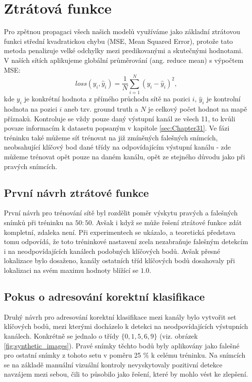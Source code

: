 \section{Ztrátová funkce}
\label{sec:Chapter47}
Pro zpětnou propagaci všech našich modelů využíváme jako základní ztrátovou funkci střední kvadratickou chybu (MSE, Mean Squared Error), protože tato metoda penalizuje velké odchylky mezi predikovanými a skutečnými hodnotami.  V naších sítích aplikujeme globální průměrování (ang. reduce mean) s výpočtem MSE:
\begin{equation}
    loss(y_i, \hat{y}_i) = \frac{1}{N} \sum_{i=1}^{N} (y_i - \hat{y}_i)^2,
\end{equation}
kde $y_i$ je konkrétní hodnota z přímého průchodu sítě na pozici $i$, $\hat{y}_i$ je kontrolní hodnota na pozici $i$ aneb tzv. ground truth a $N$ je celkový počet hodnot na mapě příznaků. Kontroluje se vždy pouze daný výstupní kanál ze všech 11, to kvůli povaze informacím k datasetu popsaným v kapitole \ref{sec:Chapter31}. Ve fázi tréninku také můžeme síť trénovat na již zmíněných falešných snímcích, neobsahující klíčový bod dané třídy na odpovídajícím výstupní kanálu - zde můžeme trénovat opět pouze na daném kanálu, opět ze stejného důvodu jako při pravých snímcích.

\subsection{První návrh ztrátové funkce}

První návrh pro trénování sítě byl rozdělit poměr výskytu pravých a falešných snímků při tréninku na $50:50$. Avšak i když se může řešení ztrátové funkce zdát kompletní, zdaleka není. Při experimentech se ukázalo, a teoretická představa tomu odpovídá, že toto tréninkové nastavení zcela nezabraňuje falešným detekcím i na neodpovídajících kanálech podobných klíčových bodů. Avšak přesné lokalizace bylo dosaženo, kanály ostatních tříd klíčových bodů dosahovaly při lokalizaci na svém maximu hodnoty blížící se $1.0$.

\subsection{Pokus o adresování korektní klasifikace}

Druhý návrh pro adresování korektní klasifikace mezi kanály bylo vytvořit set klíčových bodů, mezi kterými docházelo k detekci na neodpovídajících výstupních kanálech. Konkrétně se jednalo o třídy $\{0, 1, 5, 6, 9\}$ (viz. obrázek \ref{fig:synthetic_images}). Pravé snímky těchto bodů byly aplikovány jako falešné pro ostatní snímky z tohoto setu v poměru 25 \% k celému tréninku. Na snímcích se na základě manuální vizuální kontroly nevyskytovaly pozitivní detekce navzájem mezi sebou, čili to působilo jako řešení, které by mohlo vést ke zlepšení.

